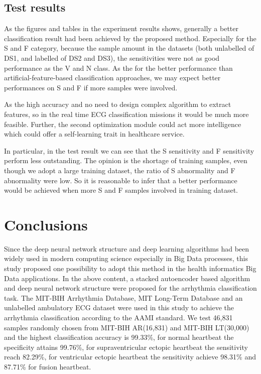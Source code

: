 \documentclass[journal]{IEEEtran}
\begin{document}

\subsection{Test results}
As the figures and tables in the experiment results shows, generally a better classification result had been achieved by the proposed method. Especially for the S and F category, because the sample amount in the datasets (both unlabelled of DS1, and labelled of DS2 and DS3), the sensitivities were not as good performance as the V and N class. As the for the better performance than artificial-feature-based classification approaches, we may expect better performances on S and F if more samples were involved.

As the high accuracy and no need to design complex algorithm to extract features, so in the real time ECG classification missions it would be much more feasible. Further, the second optimization module could act more intelligence which could offer a self-learning trait in healthcare service.

In particular, in the test result we can see that the S sensitivity and F sensitivity perform less outstanding. The opinion is the shortage of training samples, even though we adopt a large training dataset, the ratio of S abnormality and F abnormality were low. So it is reasonable to infer that a better performance would be achieved when more S and F samples involved in training dataset.

\section{Conclusions}
Since the deep neural network structure and deep learning algorithms had been widely used in modern computing science especially in Big Data processes, this study proposed one possibility to adopt this method in the health informatics Big Data applications. 
In the above content, a stacked autoencoder based algorithm and deep neural network structure were proposed for the arrhythmia classification task.  
The MIT-BIH Arrhythmia Database, MIT Long-Term Database and an unlabelled ambulatory ECG dataset were used in this study to achieve the arrhythmia classification according to the AAMI standard.
We test 46,831 samples randomly chosen from MIT-BIH AR(16,831) and MIT-BIH LT(30,000) and the highest classification accuracy is 99.33\%, for normal heartbeat the specificity attains 99.76\%, for supraventricular ectopic heartbeat the sensitivity reach  82.29\%, for ventricular ectopic heartbeat the sensitivity achieve 98.31\% and 87.71\% for fusion heartbeat.
\end{document}
